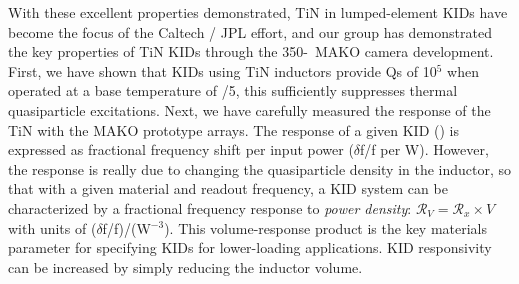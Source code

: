 \vspace{0.05in}{\bf Measured TIN KID Q and responsivity.}   With these excellent properties demonstrated, TiN in lumped-element KIDs have become the focus of the Caltech / JPL effort, and our group has demonstrated the key properties of TiN KIDs through the 350-\mum\ MAKO camera development.  
First, we have shown that KIDs using TiN inductors provide Qs of 10$^5$ when operated at a base temperature of \Tc /5, this sufficiently suppresses thermal quasiparticle excitations. 
Next, we have carefully measured the response of the TiN with the MAKO prototype arrays.  The response of a given KID (\response) is expressed as fractional frequency shift per input power ($\delta$f/f per W).  However, the response is really due to changing the quasiparticle density in the inductor, so that with a given material and readout frequency, a KID system can be  characterized by a fractional frequency response to {\it power density}: $\mathcal{R}_V = \mathcal{R}_x\!\times\!V$ with units of ($\delta$f/f)/(W\mum$^{-3}$). This volume-response product is the key materials parameter for specifying KIDs for lower-loading applications.  KID responsivity can be increased  by simply reducing the inductor volume.

